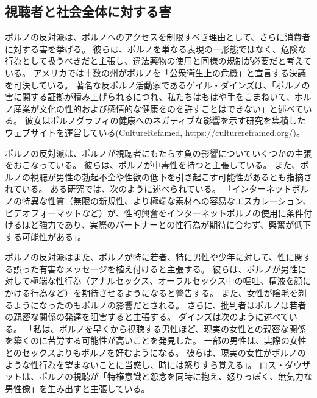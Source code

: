 \documentclass[paper=a4,book,openany]{jlreq}
\begin{document}
\subsection{視聴者と社会全体に対する害}

ポルノの反対派は、ポルノへのアクセスを制限すべき理由として、さらに消費者に対する害を挙げる。
彼らは、ポルノを単なる表現の一形態ではなく、危険な行為として扱うべきだと主張し、違法薬物の使用と同様の規制が必要だと考えている。
アメリカでは十数の州がポルノを「公衆衛生上の危機」と宣言する決議を可決している\citep{quinn19:_is_porn_public_healt_crisis}。
著名な反ポルノ活動家であるゲイル・ダインズは、「ポルノの害に関する証拠が積み上げられるにつれ、私たちはもはや手をこまねいて、ポルノ産業が文化の性的および感情的な健康をのを許すことはできない」と述べている\citep{dines16:_why_porn_is_public_healt_issue}。
彼女はポルノグラフィの健康へのネガティブな影響を示す研究を集積したウェブサイトを運営している(CultureRefamed, \url{https://culturereframed.org/})。

ポルノの反対派は、ポルノが視聴者にもたらす負の影響についていくつかの主張をおこなっている。
彼らは、ポルノが中毒性を持つと主張している\citep{snagowski15:_implic_assoc_cyber_addic}。
また、ポルノの視聴が男性の勃起不全や性欲の低下を引き起こす可能性があるとも指摘されている。
ある研究では、次のように述べられている。
「インターネットポルノの特異な性質（無限の新規性、より極端な素材への容易なエスカレーション、ビデオフォーマットなど）が、性的興奮をインターネットポルノの使用に条件付けるほど強力であり、実際のパートナーとの性行為が期待に合わず、興奮が低下する可能性がある」\citep[p.1]{park16:_is_inter_pornog_causin_sexual_dysfun}。

ポルノの反対派はまた、ポルノが特に若者、特に男性や少年に対して、性に関する誤った有害なメッセージを植え付けると主張する。
彼らは、ポルノが男性に対して極端な性行為（アナルセックス、オーラルセックス中の嘔吐、精液を顔にかける行為など）を期待させるようになると警告する。
また、女性が陰毛を剃るようになったのもポルノの影響だとされる\citep{fetters11:_new_full_front}。
さらに、批判者はポルノは若者の親密な関係の発達を阻害すると主張する。
ダインズは次のように述べている。
「私は、ポルノを早くから視聴する男性ほど、現実の女性との親密な関係を築くのに苦労する可能性が高いことを発見した。
一部の男性は、実際の女性とのセックスよりもポルノを好むようになる。
彼らは、現実の女性がポルノのような性行為を望まないことに当惑し、時には怒りすら覚える」\citep{bindel10:_truth_porn_indus}。
ロス・ダウザットは、ポルノの視聴が「特権意識と怨念を同時に抱え、怒りっぽく、無気力な男性像」を生み出すと主張している\citep{douthat18:_lets_ban_porn}。
\end{document}
